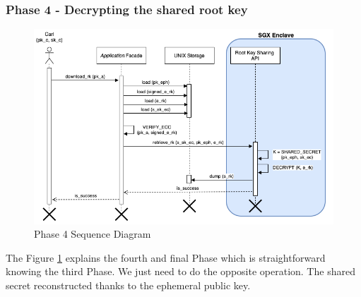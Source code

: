 \documentclass[../main.tex]{subfiles}
\begin{document}
\subsubsection{Phase 4 - Decrypting the shared root key}
\begin{figure}[h]
    \centering
    \includegraphics[width=\textwidth]{../../images/lauxus/download_rk}
    
    \caption{Phase 4 Sequence Diagram}
    \label{figure:lauxus:download_rk}
\end{figure}
\par The Figure \ref{figure:lauxus:download_rk} explains the fourth and final Phase which is straightforward knowing the third Phase. We just need to do the opposite operation. The shared secret reconstructed thanks to the ephemeral public key.
\end{document}
